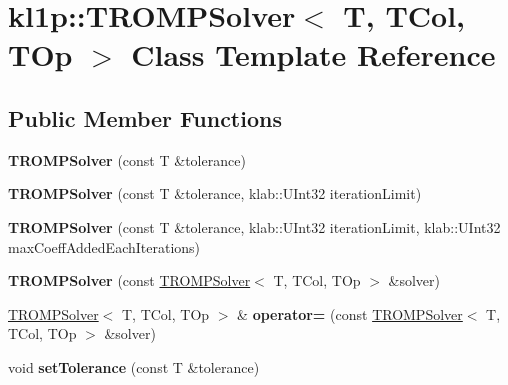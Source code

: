 \hypertarget{classkl1p_1_1TROMPSolver}{}\section{kl1p\+:\+:T\+R\+O\+M\+P\+Solver$<$ T, T\+Col, T\+Op $>$ Class Template Reference}
\label{classkl1p_1_1TROMPSolver}
\subsection*{Public Member Functions}
\begin{DoxyCompactItemize}
\item 
{\bfseries T\+R\+O\+M\+P\+Solver} (const T \&tolerance)\hypertarget{classkl1p_1_1TROMPSolver_a255731d0a2ea5f506852ea9daf77c80b}{}\label{classkl1p_1_1TROMPSolver_a255731d0a2ea5f506852ea9daf77c80b}

\item 
{\bfseries T\+R\+O\+M\+P\+Solver} (const T \&tolerance, klab\+::\+U\+Int32 iteration\+Limit)\hypertarget{classkl1p_1_1TROMPSolver_a3c85400d5377c4fab780ab8ea44a72ed}{}\label{classkl1p_1_1TROMPSolver_a3c85400d5377c4fab780ab8ea44a72ed}

\item 
{\bfseries T\+R\+O\+M\+P\+Solver} (const T \&tolerance, klab\+::\+U\+Int32 iteration\+Limit, klab\+::\+U\+Int32 max\+Coeff\+Added\+Each\+Iterations)\hypertarget{classkl1p_1_1TROMPSolver_a8774e07b14526e78de0d39930c6c18bf}{}\label{classkl1p_1_1TROMPSolver_a8774e07b14526e78de0d39930c6c18bf}

\item 
{\bfseries T\+R\+O\+M\+P\+Solver} (const \hyperlink{classkl1p_1_1TROMPSolver}{T\+R\+O\+M\+P\+Solver}$<$ T, T\+Col, T\+Op $>$ \&solver)\hypertarget{classkl1p_1_1TROMPSolver_ad12755dfbc49685c04be99f2c5ea9fb2}{}\label{classkl1p_1_1TROMPSolver_ad12755dfbc49685c04be99f2c5ea9fb2}

\item 
\hyperlink{classkl1p_1_1TROMPSolver}{T\+R\+O\+M\+P\+Solver}$<$ T, T\+Col, T\+Op $>$ \& {\bfseries operator=} (const \hyperlink{classkl1p_1_1TROMPSolver}{T\+R\+O\+M\+P\+Solver}$<$ T, T\+Col, T\+Op $>$ \&solver)\hypertarget{classkl1p_1_1TROMPSolver_ae753893ba105236bf834d904eb971972}{}\label{classkl1p_1_1TROMPSolver_ae753893ba105236bf834d904eb971972}

\item 
void {\bfseries set\+Tolerance} (const T \&tolerance)\hypertarget{classkl1p_1_1TROMPSolver_abe604d0b0530c3b0f10af149d9980660}{}\label{classkl1p_1_1TROMPSolver_abe604d0b0530c3b0f10af149d9980660}


\end{DoxyCompactItemize}
